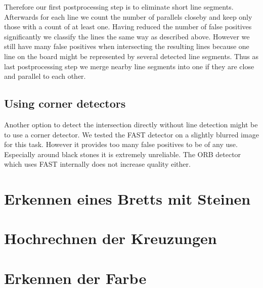 	Therefore our first postprocessing step is to eliminate short line segments. Afterwards for each line we count the number of parallels closeby and keep only those with a count of at least one. Having reduced the number of false positives significantly we classify the lines the same way as described above. However we still have many false positives when intersecting the resulting lines because one line on the board might be represented by several detected line segments. Thus as last postprocessing step we merge nearby line segments into one if they are close and parallel to each other.
	\\

	\subsection{Using corner detectors}
	Another option to detect the intersection directly without line detection might be to use a corner detector. We tested the FAST \cite{} detector on a slightly blurred image for this task. However it provides too many false positives to be of any use. Especially around black stones it is extremely unreliable. The ORB detector which uses FAST internally does not increase quality either.

	\section{Erkennen eines Bretts mit Steinen}
	\section{Hochrechnen der Kreuzungen}
	\section{Erkennen der Farbe}
